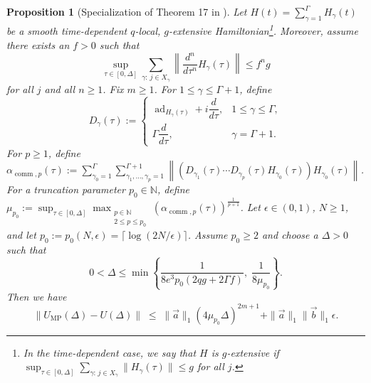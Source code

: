 \documentclass[10pt,reqno]{article}
\numberwithin{equation}{section}
\theoremstyle{plain}
\newtheorem{prop}[thm]{Proposition}
\theoremstyle{definition}
\begin{document}
\begin{prop}[Specialization of Theorem 17 in \cite{mizuta2024MPFtimedep}]
\label{prop:mizuta-time-dep-short}
Let $H(t)=\sum_{\gamma=1}^{\Gamma} H_\gamma(t)$ be a smooth time-dependent $q$-local, $g$-extensive Hamiltonian\footnote{In the time-dependent case, we say that $H$ is $g$-extensive if $\sup_{\tau\in[0,\Delta]}\sum_{\gamma:\,j\in X_\gamma}\|H_\gamma(\tau)\|\le g$ for all $j$. }.
Moreover, assume there exists an $f>0$ such that
\begin{equation}
\sup_{\tau\in[0,\Delta]} \sum_{\gamma:\,j\in X_\gamma} \left\| \frac{d^n}{d\tau^n}H_\gamma(\tau) \right\| \le f^n g
\end{equation}
for all $j$ and all $n\ge 1$. Fix $m\ge 1$. For $1\le \gamma\le \Gamma+1$, define
\begin{equation}
D_\gamma(\tau) := \begin{cases} \operatorname{ad}_{H_\gamma(\tau)}+ i\dfrac{d}{d\tau}, & 1\le \gamma\le \Gamma,\\ \Gamma\dfrac{d}{d\tau}, & \gamma=\Gamma+1. \end{cases}
\end{equation}
For $p\ge 1$, define $\alpha_{\operatorname{comm},p}(\tau) := \sum_{\gamma_0=1}^{\Gamma} \sum_{\gamma_1,\ldots,\gamma_p=1}^{\Gamma+1} \left\| \left( D_{\gamma_1}(\tau)\cdots D_{\gamma_p}(\tau)H_{\gamma_0}(\tau) \right) H_{\gamma_0}(\tau) \right\|$. 
For a truncation parameter $p_0\in\mathbb{N}$, define
$\mu_{p_0} := \sup_{\tau\in[0,\Delta]} \max_{\substack{p\in\mathbb{N}\\2\le p\le p_0}} \left( \alpha_{\operatorname{comm},p}(\tau) \right)^{\frac{1}{p+1}}$. 
Let $\epsilon\in(0,1)$, $N\ge 1$, and let $p_0:=p_0(N,\epsilon)=\lceil\log(2N/\epsilon)\rceil$.
Assume $p_0\ge 2$ and choose a $\Delta>0$ such that
\begin{equation}
0<\Delta \le \min\left\{ \frac{1}{8e^3p_0(2qg+2\Gamma f)},\;\frac{1}{8\mu_{p_0}} \right\}.
\label{eq:td-mizuta-step-condition-p2}
\end{equation}
Then we have
\begin{equation}
\left\| U_{\operatorname{MP}}(\Delta)-U(\Delta) \right\| \;\le\; \|\vec a\|_1 (4\mu_{p_0}\Delta)^{2m+1} + \|\vec a\|_1\|\vec b\|_1\epsilon.
\label{eq:td-mizuta-mpf-error-p2}
\end{equation}
\end{prop}

\end{document}
